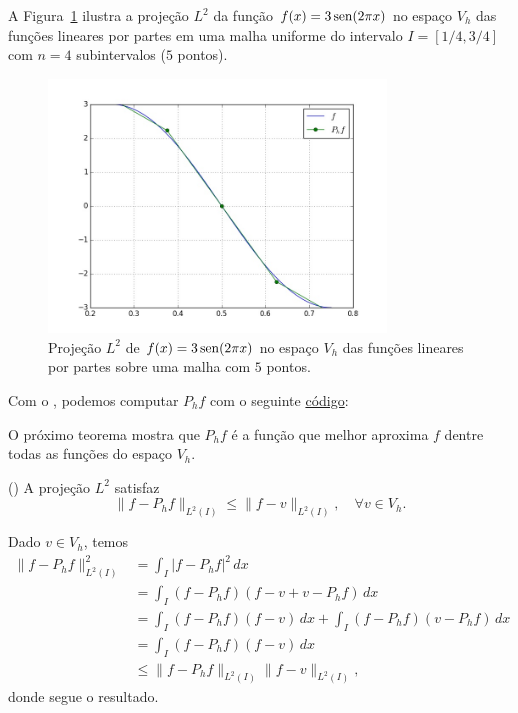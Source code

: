 \begin{ex}\label{ex:proj}
  A Figura~\ref{fig:ex_proj} ilustra a projeção $L^2$ da função $f(x)=3\operatorname{sen}(2\pi x)$ no espaço $V_h$ das funções lineares por partes em uma malha uniforme do intervalo $I=[1/4, 3/4]$ com $n=4$ subintervalos ($5$ pontos). 

  \begin{figure}[h!]
    \centering
    \includegraphics[width=0.8\textwidth]{./cap_mef1d/dados/ex_proj/ex_proj}
    \caption{Projeção $L^2$ de $f(x)=3\operatorname{sen}(2\pi x)$ no espaço $V_h$ das funções lineares por partes sobre uma malha com $5$ pontos.}
    \label{fig:ex_proj}
  \end{figure}

\ifispython
Com o \fenics, podemos computar $P_h f$ com o seguinte \href{https://github.com/phkonzen/notas/blob/master/src/MetodoElementosFinitos/cap_mef1d/dados/ex_proj/ex_proj.py}{código}:

\fi
\end{ex}

O próximo teorema mostra que $P_h f$ é a função que melhor aproxima $f$ dentre todas as funções do espaço $V_h$.

\begin{teo}()\label{teo:melhor_aprox}
  A projeção $L^2$ satisfaz
  \begin{equation}
    \|f-P_hf\|_{L^2(I)} \leq \|f - v\|_{L^2(I)},\quad\forall v\in V_h.
  \end{equation}
\end{teo}
\begin{dem}
  Dado $v\in V_h$, temos
  \begin{align}
    \|f-P_hf\|_{L^2(I)}^2 &= \int_I |f-P_hf|^2\,dx\\
    &= \int_I (f-P_hf)(f-v+v-P_hf)\,dx\\
    &= \int_I(f-P_hf)(f-v)\,dx + \int_I(f-P_hf)(v-P_hf)\,dx\\
    &= \int_I (f-P_hf)(f-v)\,dx\\
    &\leq \|f-P_hf\|_{L^2(I)}\|f-v\|_{L^2(I)},
  \end{align}
donde segue o resultado.
\end{dem}

